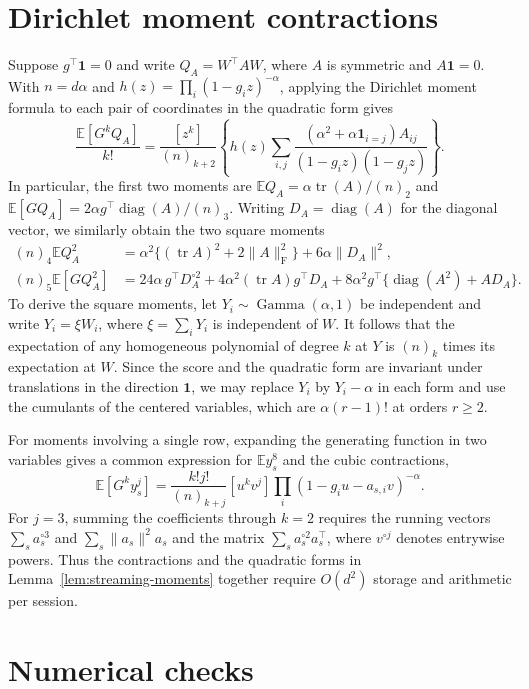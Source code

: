 \documentclass{article}
\numberwithin{equation}{section}
\theoremstyle{remark}
\newcommand{\E}{\mathbb E}
\newcommand{\one}{\mathbf 1}
\DeclareMathOperator{\tr}{tr}
\DeclareMathOperator{\diag}{diag}
\begin{document}
\section{Dirichlet moment contractions}\label{sec:contractions}

Suppose $g^\top\one=0$ and write $Q_A=W^\top A W$, where $A$ is
symmetric and $A\one=0$. With $n=d\alpha$ and
$h(z)=\prod_i(1-g_i z)^{-\alpha}$, applying the Dirichlet moment
formula to each pair of coordinates in the quadratic form gives
\[
 \frac{\E[G^kQ_A]}{k!}=
 \frac{[z^k]}{(n)_{k+2}}\left\{h(z)\sum_{i,j}
 \frac{(\alpha^2+\alpha\mathbf1_{i=j})A_{ij}}
      {(1-g_i z)(1-g_j z)}\right\}.
\]
In particular, the first two moments are
$\E Q_A=\alpha\tr(A)/(n)_2$ and $\E[GQ_A]=2\alpha g^\top\diag(A)/(n)_3$.
Writing $D_A=\diag(A)$ for the diagonal vector, we similarly obtain
the two square moments
\begin{align*}
 (n)_4\E Q_A^2&=\alpha^2\{(\tr A)^2+2\|A\|_{\mathrm F}^2\}
                         +6\alpha\|D_A\|^2,\\
 (n)_5\E[GQ_A^2]&=24\alpha\,g^\top D_A^{\circ2}
       +4\alpha^2(\tr A)g^\top D_A
       +8\alpha^2 g^\top\{\diag(A^2)+A D_A\}.
\end{align*}
To derive the square moments, let
$Y_i\sim\operatorname{Gamma}(\alpha,1)$ be independent and write
$Y_i=\xi W_i$, where $\xi=\sum_iY_i$ is independent of $W$. It
follows that the expectation of any homogeneous polynomial of degree
$k$ at $Y$ is $(n)_k$ times its expectation at $W$. Since the score
and the quadratic form are invariant under translations in the
direction $\one$, we may replace $Y_i$ by $Y_i-\alpha$ in each form and use the cumulants of
the centered variables, which are $\alpha(r-1)!$ at orders $r\ge2$.

For moments involving a single row, expanding the generating function
in two variables gives a common expression for $\E y_s^8$ and the
cubic contractions,
\[
 \E[G^k y_s^j]=\frac{k!j!}{(n)_{k+j}}[u^k v^j]
                 \prod_i(1-g_i u-a_{s,i}v)^{-\alpha}.
\]
For $j=3$, summing the coefficients through $k=2$ requires the
running vectors $\sum_s a_s^{\circ3}$ and $\sum_s\|a_s\|^2a_s$ and
the matrix $\sum_s a_s^{\circ2}a_s^\top$, where $v^{\circ j}$
denotes entrywise powers. Thus the contractions and the quadratic
forms in Lemma~\ref{lem:streaming-moments} together require $O(d^2)$
storage and arithmetic per session.

\section{Numerical checks}
\label{app:equity-protocol}
\small
\end{document}
